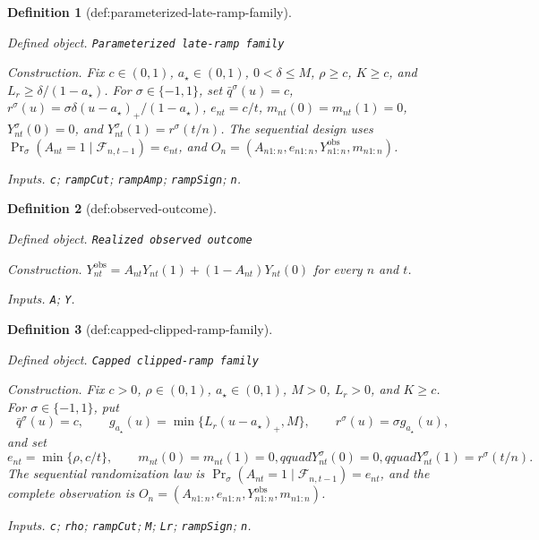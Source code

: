 \documentclass{article}
\newtheorem{definition}{Definition}
\begin{document}
\begin{definition}[def:parameterized-late-ramp-family]\label{def:parameterized-late-ramp-family}
\par\smallskip\noindent\emph{Defined object.} \texttt{Parameterized late-\allowbreak{}ramp family}
\par\smallskip\noindent\emph{Construction.} Fix \(c\in(0,1)\), \(a_\star\in(0,1)\), \(0<\delta\le M\), \(\rho\ge c\), \(K\ge c\), and \(L_r\ge\delta/(1-a_\star)\). For \(\sigma\in\{-1,1\}\), set \(\bar q^\sigma(u)=c\), \(r^\sigma(u)=\sigma\delta(u-a_\star)_+/(1-a_\star)\), \(e_{nt}=c/t\), \(m_{nt}(0)=m_{nt}(1)=0\), \(Y_{nt}^\sigma(0)=0\), and \(Y_{nt}^\sigma(1)=r^\sigma(t/n)\). The sequential design uses \(\Pr_\sigma(A_{nt}=1\mid\mathcal F_{n,t-1})=e_{nt}\), and \(O_n=(A_{n1:n},e_{n1:n},Y_{n1:n}^{\mathrm{obs}},m_{n1:n})\).
\par\smallskip\noindent\emph{Inputs.} \texttt{c}; \texttt{rampCut}; \texttt{rampAmp}; \texttt{rampSign}; \texttt{n}.
\end{definition}

\begin{definition}[def:observed-outcome]\label{def:observed-outcome}
\par\smallskip\noindent\emph{Defined object.} \texttt{Realized observed outcome}
\par\smallskip\noindent\emph{Construction.} \(Y_{nt}^{\mathrm{obs}}=A_{nt}Y_{nt}(1)+(1-A_{nt})Y_{nt}(0)\) for every \(n\) and \(t\).
\par\smallskip\noindent\emph{Inputs.} \texttt{A}; \texttt{Y}.
\end{definition}

\begin{definition}[def:capped-clipped-ramp-family]\label{def:capped-clipped-ramp-family}
\par\smallskip\noindent\emph{Defined object.} \texttt{Capped clipped-\allowbreak{}ramp family}
\par\smallskip\noindent\emph{Construction.} Fix \(c>0\), \(\rho\in(0,1)\), \(a_\star\in(0,1)\), \(M>0\), \(L_r>0\), and \(K\ge c\). For \(\sigma\in\{-1,1\}\), put
\[
 \bar q^\sigma(u)=c,\qquad
 g_{a_\star}(u)=\min\{L_r(u-a_\star)_+,M\},\qquad
 r^\sigma(u)=\sigma g_{a_\star}(u),
\]
and set
\[
 e_{nt}=\min\{\rho,c/t\},\qquad
 m_{nt}(0)=m_{nt}(1)=0,qquad
 Y_{nt}^\sigma(0)=0,qquad
 Y_{nt}^\sigma(1)=r^\sigma(t/n).
\]
The sequential randomization law is
\(\Pr_\sigma(A_{nt}=1\mid\mathcal F_{n,t-1})=e_{nt}\), and the complete observation is \(O_n=(A_{n1:n},e_{n1:n},Y_{n1:n}^{\mathrm{obs}},m_{n1:n})\).
\par\smallskip\noindent\emph{Inputs.} \texttt{c}; \texttt{rho}; \texttt{rampCut}; \texttt{M}; \texttt{Lr}; \texttt{rampSign}; \texttt{n}.
\end{definition}
\end{document}
